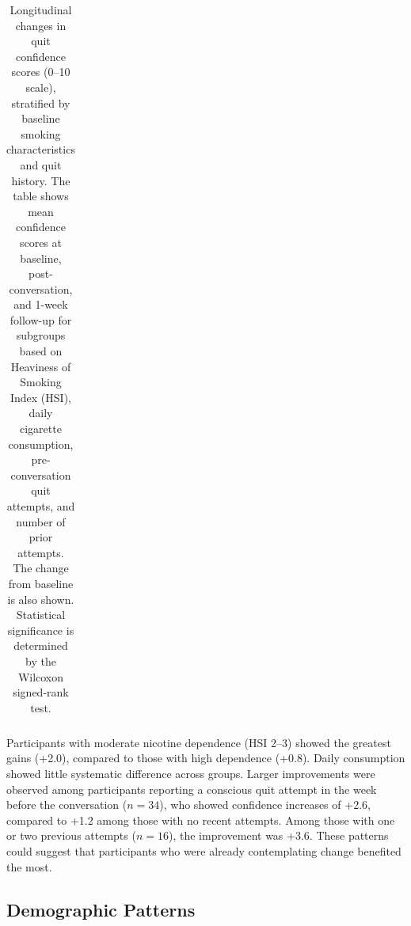 \begin{table}[ht!]
\begin{tabular*}{\linewidth}{@{\extracolsep{\fill}}lccccc@{}}
    \bottomrule
  \end{tabular*}
  \caption[Confidence Changes by Smoking Characteristics]{Longitudinal changes in quit confidence scores (0--10 scale), stratified by baseline smoking characteristics and quit history. The table shows mean confidence scores at baseline, post-conversation, and 1-week follow-up for subgroups based on Heaviness of Smoking Index (HSI), daily cigarette consumption, pre-conversation quit attempts, and number of prior attempts. The change from baseline is also shown. Statistical significance is determined by the Wilcoxon signed-rank test.}
  \label{tab:hsi_prequit}
\end{table}


Participants with moderate nicotine dependence (HSI 2--3) showed the greatest gains (+2.0), compared to those with high dependence  (+0.8). Daily consumption showed little systematic difference across groups. Larger improvements were observed among participants reporting a conscious quit attempt in the week before the conversation ($n=34$), who showed confidence increases of +2.6, compared to +1.2 among those with no recent attempts. Among those with one or two previous attempts ($n=16$), the improvement was +3.6. These patterns could suggest that participants who were already contemplating change benefited the most.

\subsection{Demographic Patterns}

